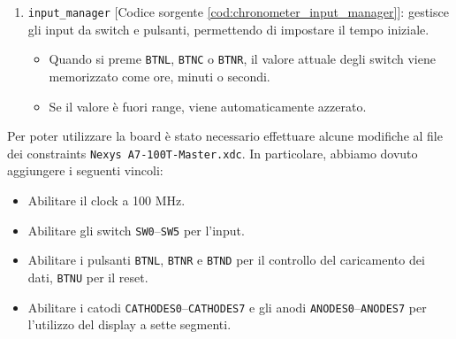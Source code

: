 \begin{enumerate}
\begin{itemize}
    \end{itemize}
    \item \texttt{input\_manager} [Codice sorgente \ref{cod:chronometer_input_manager}]: gestisce gli input da switch e pulsanti, permettendo di impostare il tempo iniziale.
    \begin{itemize}
        \item Quando si preme \texttt{BTNL}, \texttt{BTNC} o \texttt{BTNR}, il valore attuale degli switch viene memorizzato come ore, minuti o secondi.
        \item Se il valore è fuori range, viene automaticamente azzerato.
    \end{itemize}
\end{enumerate}

Per poter utilizzare la board è stato necessario effettuare alcune modifiche al file dei constraints \texttt{Nexys A7-100T-Master.xdc}. In particolare, abbiamo dovuto aggiungere i seguenti vincoli:
\begin{itemize}
    \item Abilitare il clock a 100 MHz.
    \item Abilitare gli switch \texttt{SW0}--\texttt{SW5} per l’input.
    \item Abilitare i pulsanti \texttt{BTNL}, \texttt{BTNR} e \texttt{BTND} per il controllo del caricamento dei dati, \texttt{BTNU} per il reset.
    \item Abilitare i catodi \texttt{CATHODES0}--\texttt{CATHODES7} e gli anodi \texttt{ANODES0}--\texttt{ANODES7} per l'utilizzo del display a sette segmenti.
\end{itemize}
